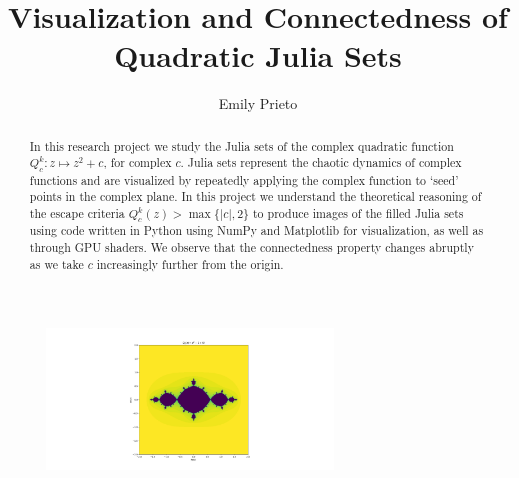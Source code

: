 \documentclass{article}
\title{
\textbf{Visualization and Connectedness of Quadratic Julia Sets}
}
\author{Emily Prieto}
\date{}
\begin{document}
\maketitle
\vspace{-0.5in}
\begin{figure}[htb!]
	\centering
	\includegraphics[width=3in]{./Figure_1.png}
\end{figure}
\vspace{-.2in}

\begin{abstract}
	In this research project we study the Julia sets of the complex quadratic
	function $Q^k_c\colon z \mapsto z^2 + c$, for complex $c$. Julia sets
	represent the chaotic dynamics of complex functions and are visualized by
	repeatedly applying the complex function to `seed' points in the complex plane.
	In this project we understand the theoretical reasoning of the
	escape criteria $Q^k_c(z) > \operatorname{max}\{|c|, 2\}$ to  produce images
	of the filled Julia sets using code written in Python using NumPy
	and Matplotlib for visualization, as well as through GPU shaders.
	We observe that the connectedness property
	changes abruptly as we take $c$ increasingly further from the origin.
	\begin{figure}[htb!]
		\centering
	\end{figure}
\end{abstract}
\end{document}
